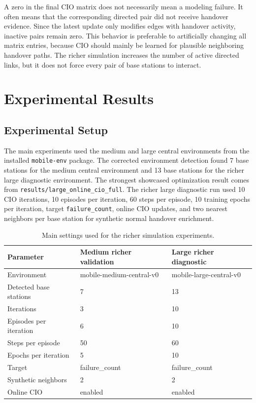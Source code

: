 \documentclass[11pt, a4paper, twoside]{article}
\begin{document}
A zero in the final CIO matrix does not necessarily mean a modeling failure. It often means that the corresponding directed pair did not receive handover evidence. Since the latest update only modifies edges with handover activity, inactive pairs remain zero. This behavior is preferable to artificially changing all matrix entries, because CIO should mainly be learned for plausible neighboring handover paths. The richer simulation increases the number of active directed links, but it does not force every pair of base stations to interact.

\section{Experimental Results}
\label{sec:experiments}

\subsection{Experimental Setup}

The main experiments used the medium and large central environments from the installed \texttt{mobile-env} package. The corrected environment detection found 7 base stations for the medium central environment and 13 base stations for the richer large diagnostic environment. The strongest showcased optimization result comes from \texttt{results/large\_online\_cio\_full}. The richer large diagnostic run used 10 CIO iterations, 10 episodes per iteration, 60 steps per episode, 10 training epochs per iteration, target \texttt{failure\_count}, online CIO updates, and two nearest neighbors per base station for synthetic normal handover enrichment.

\begin{table}[H]
\centering
\begin{tabular}{lll}
\toprule
Parameter & Medium richer validation & Large richer diagnostic \\
\midrule
Environment & mobile-medium-central-v0 & mobile-large-central-v0 \\
Detected base stations & 7 & 13 \\
Iterations & 3 & 10 \\
Episodes per iteration & 6 & 10 \\
Steps per episode & 50 & 60 \\
Epochs per iteration & 5 & 10 \\
Target & failure\_count & failure\_count \\
Synthetic neighbors & 2 & 2 \\
Online CIO & enabled & enabled \\
\bottomrule
\end{tabular}
\caption{Main settings used for the richer simulation experiments.}
\label{tab:main_settings}
\end{table}
\end{document}

